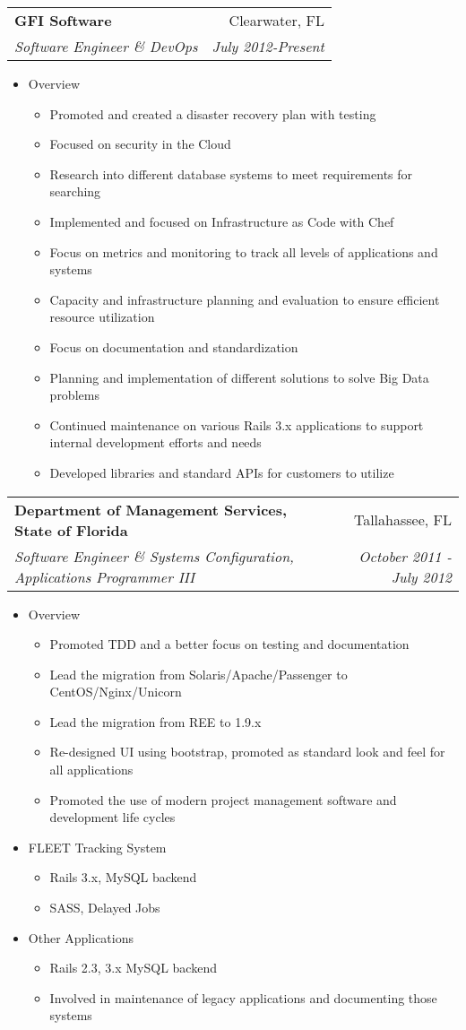 \documentclass[letterpaper,11pt]{article}
\makeatletter
\newcommand{\resitem}[1]{\item #1 \vspace{-2pt}}
\newcommand{\ressubheading}[4]{
\begin{tabular*}{7.0in}{l@{\extracolsep{\fill}}r}
		\textbf{#1} & #2 \\
		\textit{#3} & \textit{#4} \\
\end{tabular*}\vspace{-6pt}}
\makeatother
\begin{document}
\ressubheading{GFI Software}{Clearwater, FL}{Software Engineer \& DevOps}{July 2012-Present}
\begin{itemize}
        \resitem{Overview} 
        \begin{itemize}
                \resitem{Promoted and created a disaster recovery plan with testing}
                \resitem{Focused on security in the Cloud}
                \resitem{Research into different database systems to meet requirements for searching}
                \resitem{Implemented and focused on Infrastructure as Code with Chef}
                \resitem{Focus on metrics and monitoring to track all levels of applications and systems}
                \resitem{Capacity and infrastructure planning and evaluation to ensure efficient resource utilization}
                \resitem{Focus on documentation and standardization}
                \resitem{Planning and implementation of different solutions to solve Big Data problems}
                \resitem{Continued maintenance on various Rails 3.x applications to support internal development efforts and needs}
                \resitem{Developed libraries and standard APIs for customers to utilize}
        \end{itemize}
\end{itemize}

\ressubheading{Department of Management Services, State of Florida}{Tallahassee, FL}{Software Engineer \& Systems Configuration, Applications Programmer III}{October 2011 - July 2012}
\begin{itemize}
        \resitem{Overview} 
        \begin{itemize}
                \resitem{Promoted TDD and a better focus on testing and documentation}
                \resitem{Lead the migration from Solaris/Apache/Passenger to CentOS/Nginx/Unicorn}
                \resitem{Lead the migration from REE to 1.9.x}
                \resitem{Re-designed UI using bootstrap, promoted as standard look and feel for all applications}
                \resitem{Promoted the use of modern project management software and development life cycles}
        \end{itemize}
        \resitem{FLEET Tracking System}
        \begin{itemize}
                \resitem{Rails 3.x, MySQL backend}
                \resitem{SASS, Delayed Jobs}
        \end{itemize}
        \resitem{Other Applications}
        \begin{itemize}
                \resitem{Rails 2.3, 3.x MySQL backend}
                \resitem{Involved in maintenance of legacy applications and documenting those systems}
        \end{itemize}
\end{itemize}
\end{document}

